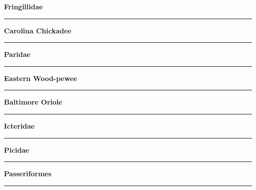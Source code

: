 \documentclass[11pt]{exam}
\newcommand*\Matching[1]{
\ifprintanswers
	\textbf{#1}
\else
	\rule{2.5in}{0.4pt}
\fi
}
\newlength\matchlena
\newlength\matchlenb
\newcommand\MatchQuestion[2]{%
	\setlength\matchlenb{\linewidth}
	\addtolength\matchlenb{-\matchlena}
	\parbox[t]{\matchlena}{\Matching{#1}}\enspace\parbox[t]{\matchlenb}{#2}}
\begin{document}
\begin{questions}
\begin{multicols}{2}
\question\MatchQuestion{Fringillidae}{}
\vspace{2\baselineskip}

\question\MatchQuestion{Carolina Chickadee}{}
\vspace{2\baselineskip}

\question\MatchQuestion{Paridae}{}
\vspace{2\baselineskip}

\question\MatchQuestion{Eastern Wood-pewee}{}
\vspace{2\baselineskip}

\question\MatchQuestion{Baltimore Oriole}{}
\vspace{2\baselineskip}

\question\MatchQuestion{Icteridae}{}
\vspace{2\baselineskip}

\question\MatchQuestion{Picidae}{}
\vspace{2\baselineskip}

\question\MatchQuestion{Passeriformes}{}
\vspace{2\baselineskip}


\end{multicols}
\end{questions}
\end{document}

